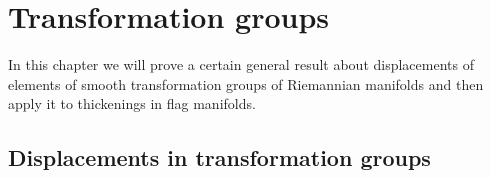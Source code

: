 \documentclass[12pt]{amsbook}%
\newtheorem{cor}[thm]{Corollary}
\theoremstyle{definition}
\theoremstyle{remark}
\numberwithin{section}{chapter}
\numberwithin{subsection}{section}
\numberwithin{figure}{chapter}
\DeclareMathOperator{\C}{\mathbb{C}}
\def\eps{\epsilon}
\def\cH{{\mathscr{H}}}
\def\kap{}
\begin{document}
{{%
%


%





\chapter[Appendix E]{Transformation groups}

In this chapter we will prove a certain general result about displacements of elements of smooth transformation groups of Riemannian manifolds and then apply it to thickenings in flag manifolds.  

\section{Displacements in transformation groups} 




}}
\end{document}
